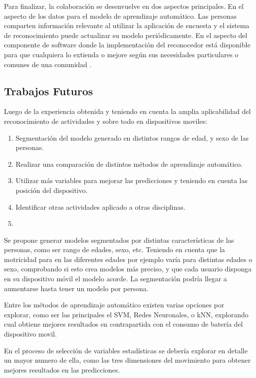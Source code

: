 Para finalizar, la colaboración se desenvuelve en dos aspectos principales.
En el aspecto de los datos para el modelo de aprendizaje automático.
Las personas comparten información relevante al utilizar la aplicación
de encuesta y el sistema de reconocimiento puede actualizar su modelo
periódicamente. En el aspecto del componente de software donde la
implementación del reconocedor está disponible para que cualquiera
lo extienda o mejore según sus necesidades particulares o comunes
de una comunidad \cite{hardroid2016b}.

\subsection{Trabajos Futuros}
Luego de la experiencia obtenida y teniendo en cuenta la amplia aplicabilidad del reconocimiento de actividades y sobre todo en dispositivos moviles:
\begin{enumerate}
	\item Segmentación del modelo generado en distintos rangos de edad, y sexo de las personas.
	\item Realizar una comparación de distintos métodos de aprendizaje automático. 
	\item Utilizar más variables para mejorar las predicciones y teniendo en cuenta las posición del dispositivo.
	\item Identificar otras actividades aplicado a otras disciplinas.
	\item <Agregar un 5to trabajo futuro>
\end{enumerate}

Se propone generar modelos segmentados por distintas características de las personas, como ser rango de edades, sexo, etc. Teniendo en cuenta que la motricidad para en las diferentes edades por ejemplo varía para distintas edades o sexo, comprobando si esto crea modelos más preciso, y que cada usuario disponga en su dispositivo móvil el modelo acorde. La segmentación podría llegar a aumentarse hasta tener un modelo por persona.

Entre los métodos de aprendizaje automático existen varias opciones por explorar, como ser las principales el SVM, Redes Neuronales, o kNN, explorando cual obtiene mejores resultados en contrapartida con el consumo de batería del dispositivo movil.

En el proceso de selección de variables estadísticas se debería explorar en detalle un mayor numero de ella, como las tres dimensiones del movimiento para obtener mejores resultados en las predicciones. 

